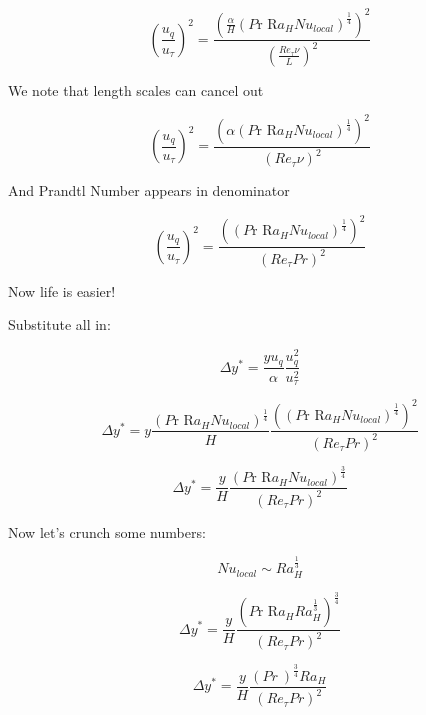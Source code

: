 \documentclass[12pt]{article}
\renewcommand{\_}{\kern-1.5pt\textunderscore\kern-1.5pt}
\begin{document}
 \[  \left( \frac{u_{q}}{u_{ \tau}} \right) ^{2}=\frac{ \left( \frac{ \alpha }{H} \left( P\text{r R}a_{H}Nu_{local} \right) ^{\frac{1}{4}} \right) ^{2}}{ \left( \frac{Re_{ \tau} \nu }{L} \right) ^{2}} \] \par

We note that length scales can cancel out\par

 \[  \left( \frac{u_{q}}{u_{ \tau}} \right) ^{2}=\frac{ \left(  \alpha  \left( P\text{r R}a_{H}Nu_{local} \right) ^{\frac{1}{4}} \right) ^{2}}{ \left( Re_{ \tau} \nu  \right) ^{2}} \] \par

And Prandtl Number appears in denominator\par

 \[  \left( \frac{u_{q}}{u_{ \tau}} \right) ^{2}=\frac{ \left(  \left( P\text{r R}a_{H}Nu_{local} \right) ^{\frac{1}{4}} \right) ^{2}}{ \left( Re_{ \tau}Pr \right) ^{2}} \] \par

Now life is easier!\par

Substitute all in:\par

 \[  \Delta y^{\ast}=\frac{yu_{q}}{ \alpha }\frac{u_{q}^{2}}{u_{ \tau}^{2}} \] \par

 \[  \Delta y^{\ast}=y\frac{ \left( P\text{r R}a_{H}Nu_{local} \right) ^{\frac{1}{4}}}{H}\frac{ \left(  \left( P\text{r R}a_{H}Nu_{local} \right) ^{\frac{1}{4}} \right) ^{2}}{ \left( Re_{ \tau}Pr \right) ^{2}} \] \par

 \[  \Delta y^{\ast}=\frac{y}{H}\frac{ \left( P\text{r R}a_{H}Nu_{local} \right) ^{\frac{3}{4}}}{ \left( Re_{ \tau}Pr \right) ^{2}} \] \par

Now let’s crunch some numbers:\par

 \[ Nu_{local} \sim Ra_{H}^{\frac{1}{3}} \] \par

 \[  \Delta y^{\ast}=\frac{y}{H}\frac{ \left( P\text{r R}a_{H}Ra_{H}^{\frac{1}{3}} \right) ^{\frac{3}{4}}}{ \left( Re_{ \tau}Pr \right) ^{2}} \] \par

 \[  \Delta y^{\ast}=\frac{y}{H}\frac{ \left( Pr~ \right) ^{\frac{3}{4}}Ra_{H}}{ \left( Re_{ \tau}Pr \right) ^{2}} \] \par
\end{document}
